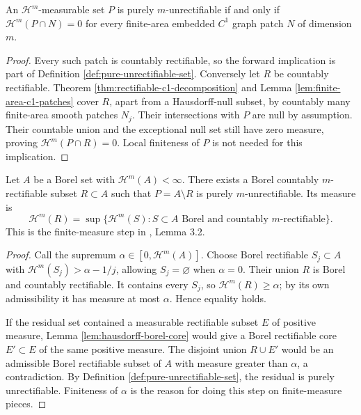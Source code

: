 \begin{proposition}\label{prop:pure-unrectifiable-patch-test}
An $\mathcal H^m$-measurable set $P$ is purely $m$-unrectifiable if and only if $\mathcal H^m(P\cap N)=0$ for every finite-area embedded $C^1$ graph patch $N$ of dimension $m$.
\end{proposition}
\begin{proof}
Every such patch is countably rectifiable, so the forward implication is part of Definition \ref{def:pure-unrectifiable-set}. Conversely let $R$ be countably rectifiable. Theorem \ref{thm:rectifiable-c1-decomposition} and Lemma \ref{lem:finite-area-c1-patches} cover $R$, apart from a Hausdorff-null subset, by countably many finite-area smooth patches $N_j$. Their intersections with $P$ are null by assumption. Their countable union and the exceptional null set still have zero measure, proving $\mathcal H^m(P\cap R)=0$. Local finiteness of $P$ is not needed for this implication.
\end{proof}

\begin{proposition}\label{prop:finite-maximal-rectifiable-part}
Let $A$ be a Borel set with $\mathcal H^m(A)<\infty$. There exists a Borel countably $m$-rectifiable subset $R\subset A$ such that $P=A\setminus R$ is purely $m$-unrectifiable. Its measure is
\[
 \mathcal H^m(R)=\sup\{\mathcal H^m(S):S\subset A\text{ Borel and countably }m\text{-rectifiable}\}.
\]
This is the finite-measure step in \cite{Sim18}, Lemma 3.2.
\end{proposition}
\begin{proof}
Call the supremum $\alpha\in[0,\mathcal H^m(A)]$. Choose Borel rectifiable $S_j\subset A$ with $\mathcal H^m(S_j)>\alpha-1/j$, allowing $S_j=\varnothing$ when $\alpha=0$. Their union $R$ is Borel and countably rectifiable. It contains every $S_j$, so $\mathcal H^m(R)\geq\alpha$; by its own admissibility it has measure at most $\alpha$. Hence equality holds.

If the residual set contained a measurable rectifiable subset $E$ of positive measure, Lemma \ref{lem:hausdorff-borel-core} would give a Borel rectifiable core $E'\subset E$ of the same positive measure. The disjoint union $R\cup E'$ would be an admissible Borel rectifiable subset of $A$ with measure greater than $\alpha$, a contradiction. By Definition \ref{def:pure-unrectifiable-set}, the residual is purely unrectifiable. Finiteness of $\alpha$ is the reason for doing this step on finite-measure pieces.
\end{proof}

